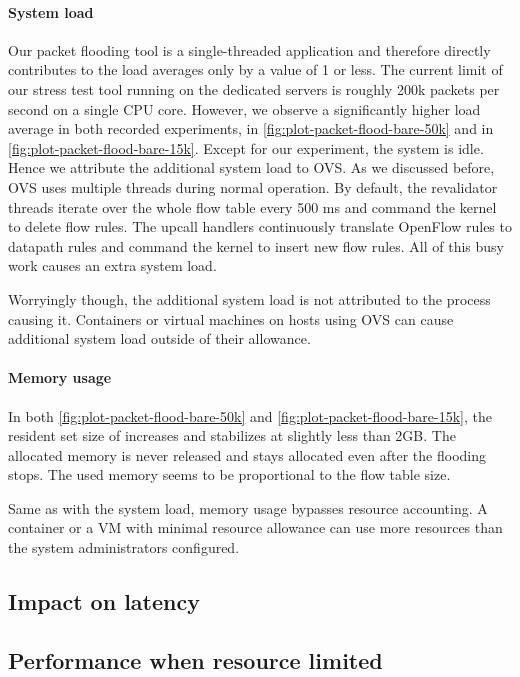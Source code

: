 \paragraph{System load}
Our packet flooding tool is a single-threaded application and therefore directly contributes to the load averages only by a value of 1 or less. The current limit of our stress test tool running on the dedicated servers is roughly 200k packets per second on a single CPU core. However, we observe a significantly higher load average in both recorded experiments, in \cref{fig:plot-packet-flood-bare-50k} and in \cref{fig:plot-packet-flood-bare-15k}. Except for our experiment, the system is idle. Hence we attribute the additional system load to OVS. As we discussed before, OVS uses multiple threads during normal operation. By default, the revalidator threads iterate over the whole flow table every 500 \si{\milli\second} and command the kernel to delete flow rules. The upcall handlers continuously translate OpenFlow rules to datapath rules and command the kernel to insert new flow rules. All of this busy work causes an extra system load.

Worryingly though, the additional system load is not attributed to the process causing it. Containers or virtual machines on hosts using OVS can cause additional system load outside of their allowance.

\paragraph{Memory usage}
In both \cref{fig:plot-packet-flood-bare-50k} and \cref{fig:plot-packet-flood-bare-15k}, the resident set size of  increases and stabilizes at slightly less than 2GB. The allocated memory is never released and stays allocated even after the flooding stops. The used memory seems to be proportional to the flow table size.

Same as with the system load, memory usage bypasses resource accounting. A container or a VM with minimal resource allowance can use more resources than the system administrators configured.

\subsection{Impact on latency}


\subsection{Performance when resource limited}

